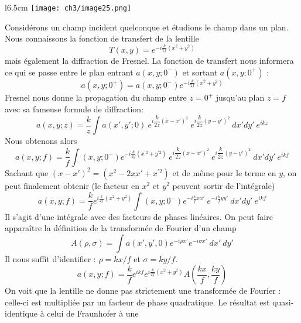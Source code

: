 	\begin{wrapfigure}[10]{l}{6.5cm}
	\vspace{-5mm}
	\texttt{[image: ch3/image25.png]}
	\end{wrapfigure}		
Considérons un champ incident quelconque et étudions le champ dans un plan. Nous connaissons 
la fonction de transfert de la lentille
\begin{equation}
T(x,y) = e^{-i\frac{k}{2f}(x^2+y^2)}
\end{equation}
mais également la diffraction de Fresnel. La fonction de transfert nous informera ce qui se passe 
entre le plan entrant $a(x,y;0^-)$ et sortant $a(x,y;0^+)$ :
\begin{equation}
a(x,y;0^+) = a(x,y;0^-)e^{-i\frac{k}{2f}(x^2+y^2)}
\end{equation}
Fresnel nous donne la propagation du champ entre $z=0^+$ jusqu'au plan $z=f$ avec sa fameuse formule 
de diffraction:
\begin{equation}
a(x,y;z) = \frac{k}{z}\int a(x',y';0)\ e^{i\dfrac{k}{2z}(x-x')^2}\
 e^{i\dfrac{k}{2z}(y-y')^2}\ dx'dy'\  e^{ikz}
\end{equation}
Nous obtenons alors
\begin{equation}
a(x,y;f) = \dfrac{k}{f}\int (x,y;0^-)e^{-i\frac{k}{2f}(x^{'2}+y^{'2})}\ e^{i\dfrac{k}{2z}(x-x')^2}\
 e^{i\dfrac{k}{2z}(y-y')^2}\ dx'dy'\  e^{ikf}
\end{equation}
Sachant que $(x-x')^2 = (x^2-2xx'+x^{'2})$ et de même pour le terme en $y$, on peut finalement 
obtenir (le facteur en $x^2$ et $y^2$ peuvent sortir de l'intégrale)
\begin{equation}
a(x,y;f) = \dfrac{k}{f}e^{i\frac{k}{2f}(x^2+y^2)}\int (x,y;0^-)e^{-i\frac{k}{f}xx'}\ e^{-i\frac{k}{f}yy'}\  
dx'dy'\  e^{ikf}
\end{equation}
Il s'agit d'une intégrale avec des facteurs de phases linéaires. On peut faire apparaître la définition de 
la transformée de Fourier d'un champ
\begin{equation}
A(\rho, \sigma) = \int a(x',y',0)e^{-i\rho x'}e^{-i\sigma x'}\ dx'\ dy'
\end{equation}
Il nous suffit d'identifier : $\rho = kx/f$ et $\sigma = ky/f$.
\begin{equation}
a(x,y;f) = \dfrac{k}{f}e^{ikf} e^{i\frac{k}{2f}(x^2+y^2)}A\left(\frac{kx}{f},\frac{ky}{f}\right)  
\end{equation}
On voit que la lentille ne donne pas strictement une transformée de Fourier : celle-ci est multipliée 
par un facteur de phase quadratique.  Le résultat est quasi-identique à celui de Fraunhofer à une 

